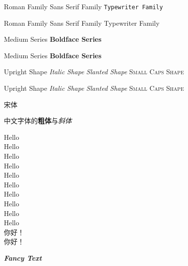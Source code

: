 \documentclass[12pt]{article} %
\newcommand{\myfont}{\textit{\textbf{\textsf{Fancy Text}}}}
\begin{document}
	\textrm{Roman Family} \textsf{Sans Serif Family} \texttt{Typewriter Family}
	
	{\rmfamily Roman Family} {\sffamily Sans Serif Family} {\ttfamily Typewriter Family}
	
	\textmd{Medium Series} \textbf{Boldface Series}
	
	{\mdseries Medium Series} {\bfseries Boldface Series}
	
	
	\textup{Upright Shape} \textit{Italic Shape}
	\textsl{Slanted Shape} \textsc{Small Caps Shape}
	
	{\upshape Upright Shape} {\itshape Italic Shape} {\slshape Slanted Shape} {\scshape Small Caps Shape}
	
	{\songti 宋体}   
	
	中文字体的\textbf{粗体}与\textit{斜体}
	
	{\tiny			Hello}\\
	{\scriptsize	Hello}\\
	{\footnotesize	Hello}\\
	{\small			Hello}\\
	{\normalsize	Hello}\\ %
	{\large			Hello}\\
	{\Large			Hello}\\
	{\LARGE			Hello}\\
	{\huge			Hello}\\
	{\Huge			Hello}\\
	
	
	 你好！\\
	 你好！%
	
	\myfont
	
	
	
\end{document}
